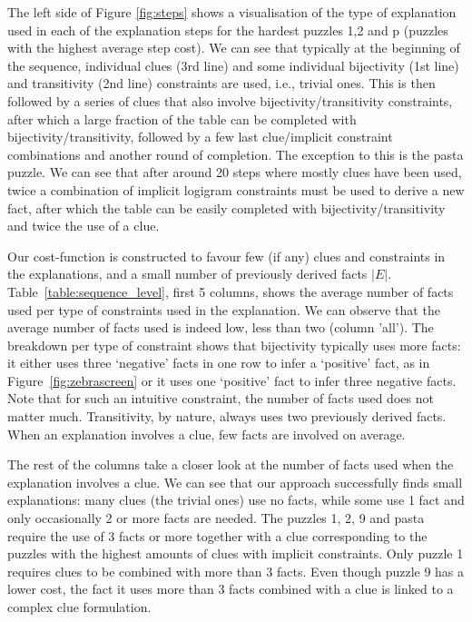 The left side of Figure \ref{fig:steps} shows a visualisation of the type of explanation used in each of the explanation steps for the hardest puzzles 1,2 and p (puzzles with the highest average step cost). 
We can see that typically at the beginning of the sequence, individual clues (3rd line) and some individual bijectivity (1st line) and transitivity (2nd line) constraints are used, i.e., trivial ones.
This is then followed by a series of clues that also involve bijectivity/transitivity constraints, after which a large fraction of the table can be completed with bijectivity/transitivity, followed by a few last clue/implicit constraint combinations and another round of completion.
The exception to this is the pasta puzzle.
We can see that after around 20 steps where mostly clues have been used, twice a combination of implicit logigram constraints must be used to derive a new fact, after which the table can be easily completed with bijectivity/transitivity and twice the use of a clue.

Our cost-function is constructed to favour few (if any) clues and constraints in the explanations, and a small number of previously derived facts $|E|$.
Table~\ref{table:sequence_level}, first 5 columns, shows the average number of facts used per type of constraints used in the explanation.
We can observe that the average number of facts used is indeed low, less than two (column 'all').
The breakdown per type of constraint shows that bijectivity typically uses more facts: it either uses three `negative' facts in one row to infer a `positive' fact, as in Figure~\ref{fig:zebrascreen} or it uses one `positive' fact to infer three negative facts.
Note that for such an intuitive constraint, the number of facts used does not matter much. 
Transitivity, by nature, always uses two previously derived facts.
When an explanation involves a clue, few facts are involved on average. 

The rest of the columns take a closer look at the number of facts used when the explanation involves a clue. We can see that our approach successfully finds small explanations: many clues (the trivial ones) use no facts, while some use 1 fact and only occasionally 2 or more facts are needed. 
The puzzles 1, 2, 9 and pasta require the use of 3 facts or more together with a clue corresponding to the puzzles with the highest amounts of clues with implicit constraints. Only puzzle 1 requires clues to be combined with more than 3 facts.
Even though puzzle 9 has a lower cost, the fact it uses more than 3 facts combined with a clue is linked to a complex clue formulation.


